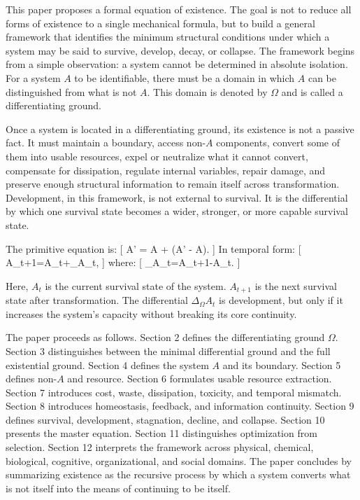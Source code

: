 \documentclass[11pt,a4paper]{article}
\begin{document}
This paper proposes a formal equation of existence. The goal is not to reduce all forms of existence to a single mechanical formula, but to build a general framework that identifies the minimum structural conditions under which a system may be said to survive, develop, decay, or collapse. The framework begins from a simple observation: a system cannot be determined in absolute isolation. For a system $A$ to be identifiable, there must be a domain in which $A$ can be distinguished from what is not $A$. This domain is denoted by $\Omega$ and is called a differentiating ground.

Once a system is located in a differentiating ground, its existence is not a passive fact. It must maintain a boundary, access non-$A$ components, convert some of them into usable resources, expel or neutralize what it cannot convert, compensate for dissipation, regulate internal variables, repair damage, and preserve enough structural information to remain itself across transformation. Development, in this framework, is not external to survival. It is the differential by which one survival state becomes a wider, stronger, or more capable survival state.

The primitive equation is:
[
A' = A + (A' - A).
]
In temporal form:
[
A_{t+1}=A_t+\Delta_{\Omega}A_t,
]
where:
[
\Delta_{\Omega}A_t=A_{t+1}-A_t.
]

Here, $A_t$ is the current survival state of the system. $A_{t+1}$ is the next survival state after transformation. The differential $\Delta_{\Omega}A_t$ is development, but only if it increases the system's capacity without breaking its core continuity.

The paper proceeds as follows. Section 2 defines the differentiating ground $\Omega$. Section 3 distinguishes between the minimal differential ground and the full existential ground. Section 4 defines the system $A$ and its boundary. Section 5 defines non-$A$ and resource. Section 6 formulates usable resource extraction. Section 7 introduces cost, waste, dissipation, toxicity, and temporal mismatch. Section 8 introduces homeostasis, feedback, and information continuity. Section 9 defines survival, development, stagnation, decline, and collapse. Section 10 presents the master equation. Section 11 distinguishes optimization from selection. Section 12 interprets the framework across physical, chemical, biological, cognitive, organizational, and social domains. The paper concludes by summarizing existence as the recursive process by which a system converts what is not itself into the means of continuing to be itself.
\end{document}
